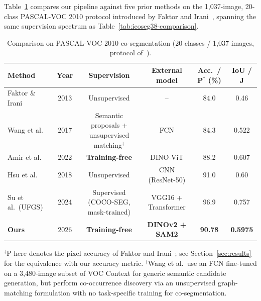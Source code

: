 Table~\ref{tab:pascal-comparison} compares our pipeline against five prior methods on the 1{,}037-image, 20-class PASCAL-VOC 2010 protocol introduced by Faktor and Irani~\cite{faktor2013}, spanning the same supervision spectrum as Table~\ref{tab:icoseg38-comparison}.
\begin{table}[t]
\centering
\caption{Comparison on PASCAL-VOC 2010 co-segmentation (20 classes / 1{,}037 images, protocol of~\cite{faktor2013}).}
\label{tab:pascal-comparison}
\begin{tabular}{lccccc}
\toprule
Method & Year & Supervision & External model & Acc.\ / P$^\dagger$ (\%) & IoU / J \\
\midrule
Faktor \& Irani~\cite{faktor2013} & 2013 & Unsupervised & -- & 84.0 & 0.46 \\
Wang et al.~\cite{wang2017nparitite} & 2017 & Semantic proposals + unsupervised matching$^\ddagger$ & FCN & 84.3 & 0.522 \\
Amir et al.~\cite{amir2022deepvit} & 2022 & \textbf{Training-free} & DINO-ViT & 88.2 & 0.607 \\
Hsu et al.~\cite{hsu2018} & 2018 & Unsupervised & CNN (ResNet-50) & 91.0 & 0.60 \\
Su et al.\ (UFGS)~\cite{su2024ufgs} & 2024 & Supervised (COCO-SEG, mask-trained) & VGG16 + Transformer & 96.9 & 0.757 \\
\textbf{Ours} & 2026 & \textbf{Training-free} & \textbf{DINOv2 + SAM2} & \textbf{90.78} & \textbf{0.5975} \\
\bottomrule
\end{tabular}
\vspace{2pt}
\footnotesize{$^\dagger$P here denotes the pixel accuracy of Faktor and Irani~\cite{faktor2013}; see Section~\ref{sec:results} for the equivalence with our accuracy metric. $^\ddagger$Wang et al.\ use an FCN fine-tuned on a 3{,}480-image subset of VOC Context for generic semantic candidate generation, but perform co-occurrence discovery via an unsupervised graph-matching formulation with no task-specific training for co-segmentation.}
\end{table}

